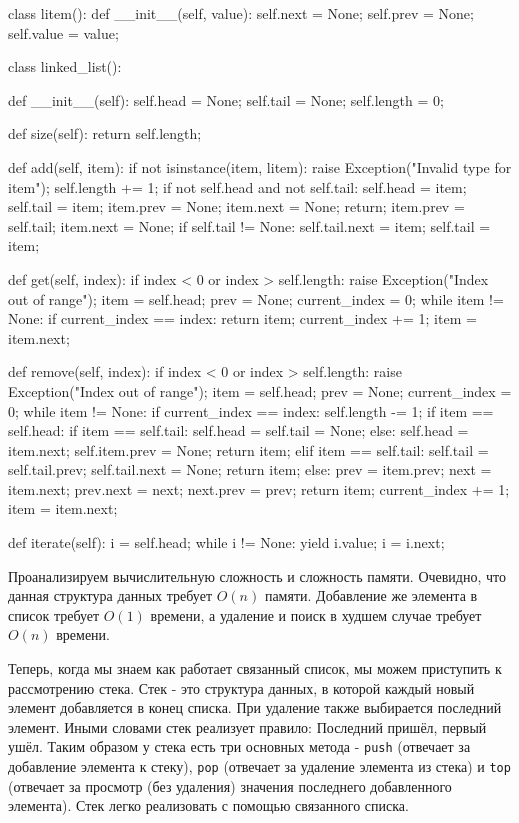 \begin{python}
class litem():
	def __init__(self, value):
		self.next = None;
		self.prev = None;
		self.value = value;

class linked_list():

	def __init__(self):
		self.head = None;
		self.tail = None;
		self.length = 0;

	def size(self):
		return self.length;

	def add(self, item):
		if not isinstance(item, litem):
			raise Exception("Invalid type for item");
		self.length += 1;
		if not self.head and not self.tail:
			self.head = item;
			self.tail = item;
			item.prev = None;
			item.next = None;
			return;
		item.prev = self.tail;
		item.next = None;
		if self.tail != None:
			self.tail.next = item;
		self.tail = item;

	def get(self, index):
		if index < 0 or index > self.length:
			raise Exception("Index out of range");
		item = self.head;
		prev = None;
		current_index = 0;
		while item != None:
			if current_index == index:
				return item;
			current_index += 1;
			item = item.next;

	def remove(self, index):
		if index < 0 or index > self.length:
			raise Exception("Index out of range");
		item = self.head;
		prev = None;
		current_index = 0;
		while item != None:
			if current_index == index:
				self.length -= 1;
				if item == self.head:
					if item == self.tail:
						self.head = self.tail = None;
					else:
						self.head = item.next;
						self.item.prev = None;
					return item;
				elif item == self.tail:
					self.tail = self.tail.prev;
					self.tail.next = None;
					return item;
				else:
					prev = item.prev;
					next = item.next;
					prev.next = next;
					next.prev = prev;
					return item;
			current_index += 1;
			item = item.next;

	def iterate(self):
		i = self.head;
		while i != None:
			yield i.value;
			i = i.next;
\end{python}

Проанализируем вычислительную сложность и сложность памяти. Очевидно, что
данная структура данных требует $O(n)$ памяти. Добавление же элемента в
список требует $O(1)$ времени, а удаление и поиск в худшем случае требует
$O(n)$ времени.

Теперь, когда мы знаем как работает связанный список, мы можем приступить 
к рассмотрению стека. Стек - это структура данных, в которой каждый 
новый элемент добавляется в конец списка. При удаление также выбирается
последний элемент. Иными словами стек реализует правило: Последний пришёл,
первый ушёл. Таким образом у стека есть три основных метода - \texttt{push} 
(отвечает за добавление элемента к стеку), \texttt{pop} (отвечает за удаление
элемента из стека) и \texttt{top} (отвечает за просмотр (без удаления) значения 
последнего добавленного элемента). Стек легко реализовать с помощью связанного 
списка.


